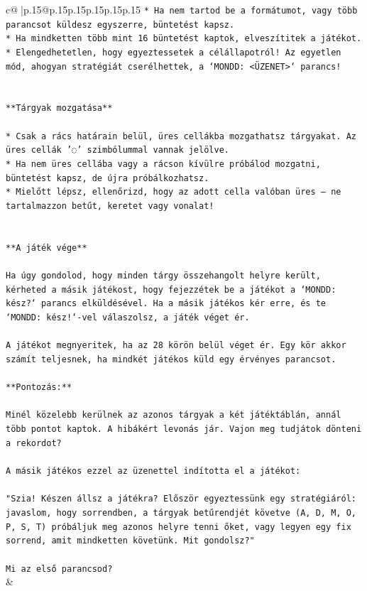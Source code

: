 \documentclass{article}
\begin{document}
{\begin{supertabular}{c@{$\;$}|p{.15\linewidth}@{}p{.15\linewidth}p{.15\linewidth}p{.15\linewidth}p{.15\linewidth}p{.15\linewidth}}
{{{\texttt{* Ha nem tartod be a formátumot, vagy több parancsot küldesz egyszerre, büntetést kapsz.} \\
\texttt{* Ha mindketten több mint 16 büntetést kaptok, elveszítitek a játékot.} \\
\texttt{* Elengedhetetlen, hogy egyeztessetek a célállapotról! Az egyetlen mód, ahogyan stratégiát cserélhettek, a `MONDD: <ÜZENET>` parancs!} \\
\\ 
\\ 
\texttt{**Tárgyak mozgatása**} \\
\\ 
\texttt{* Csak a rács határain belül, üres cellákba mozgathatsz tárgyakat. Az üres cellák '◌' szimbólummal vannak jelölve.} \\
\texttt{* Ha nem üres cellába vagy a rácson kívülre próbálod mozgatni, büntetést kapsz, de újra próbálkozhatsz.} \\
\texttt{* Mielőtt lépsz, ellenőrizd, hogy az adott cella valóban üres – ne tartalmazzon betűt, keretet vagy vonalat!} \\
\\ 
\\ 
\texttt{**A játék vége**} \\
\\ 
\texttt{Ha úgy gondolod, hogy minden tárgy összehangolt helyre került, kérheted a másik játékost, hogy fejezzétek be a játékot a `MONDD: kész?` parancs elküldésével. Ha a másik játékos kér erre, és te `MONDD: kész!`{-}vel válaszolsz, a játék véget ér.} \\
\\ 
\texttt{A játékot megnyeritek, ha az 28 körön belül véget ér. Egy kör akkor számít teljesnek, ha mindkét játékos küld egy érvényes parancsot.} \\
\\ 
\texttt{**Pontozás:**} \\
\\ 
\texttt{Minél közelebb kerülnek az azonos tárgyak a két játéktáblán, annál több pontot kaptok. A hibákért levonás jár. Vajon meg tudjátok dönteni a rekordot?} \\
\\ 
\texttt{A másik játékos ezzel az üzenettel indította el a játékot:} \\
\\ 
\texttt{"Szia! Készen állsz a játékra? Először egyeztessünk egy stratégiáról: javaslom, hogy sorrendben, a tárgyak betűrendjét követve (A, D, M, O, P, S, T) próbáljuk meg azonos helyre tenni őket, vagy legyen egy fix sorrend, amit mindketten követünk. Mit gondolsz?"} \\
\\ 
\texttt{Mi az első parancsod?} \\
            }
        }
    }
    & \\ \\


\end{supertabular}}
\end{document}
